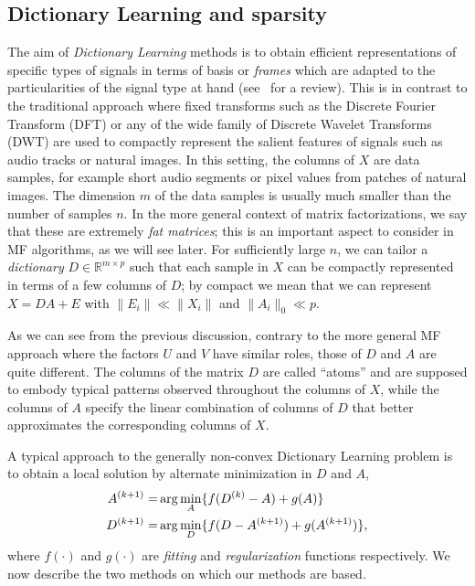 \documentclass[twocolumn]{IEEEtran}
\theoremstyle{definition}
\def\reals{\ensuremath{\mathbb{R}}}
\begin{document}
\subsection{Dictionary Learning and sparsity}
\label{sec:background:dictionary-learning}
%
The aim of \emph{Dictionary Learning} methods is to obtain efficient representations of specific types of signals in terms of basis or \emph{frames} which are adapted to the particularities of the signal type at hand (see~\cite{dl-review} for a review). This is in contrast to the traditional approach where fixed transforms such as the Discrete Fourier Transform (DFT) or any of the wide family of Discrete Wavelet Transforms (DWT) are used to compactly represent the salient features of signals such as audio tracks or natural images. In this setting, the columns of $X$ are data samples, for example short audio segments or pixel values from patches of natural images. The dimension $m$ of the data samples is usually much smaller than the number of samples $n$. In the more general context of matrix factorizations, we say that these are extremely \emph{fat matrices}; this is an important aspect to consider in MF algorithms, as we will see later.
For sufficiently large $n$, we can tailor a \emph{dictionary} $D \in \reals^{m{\times}p}$ such that each sample in $X$ can be compactly represented in terms of a few columns of $D$; by compact we mean that we can represent $X=DA+E$ with $\|E_i\| \ll \|X_i\|$ and $\|A_i\|_0 \ll p$.

As we can see from the previous discussion, contrary to the more general MF approach where the factors $U$ and $V$ have similar roles, those of $D$ and $A$ are quite different. The columns of the matrix $D$ are called ``atoms'' and are supposed to embody typical patterns observed throughout the columns of $X$, while the columns of $A$ specify the linear combination of columns of $D$ that better approximates the corresponding columns of $X$.

A typical approach to the generally non-convex Dictionary Learning problem is to obtain a local solution by alternate minimization in $D$ and $A$,
%
\begin{eqnarray}
A\iter{k+1} =& \arg\min_{A} \{ f(D\iter{k}-A) + g(A) \} \\
D\iter{k+1} =& \arg\min_{D} \{ f(D-A\iter{k+1}) + g(A\iter{k+1}) \},
\label{eq:dl}
\end{eqnarray}
%
where $f(\cdot)$ and $g(\cdot)$ are \emph{fitting} and \emph{regularization} functions respectively. We now describe  the two  methods on which our methods are based.
\end{document}
